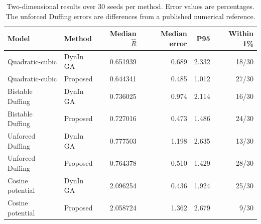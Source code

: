 \begin{table}[htbp]
\centering\small
\caption{Two-dimensional results over 30 seeds per method. Error values are percentages. The unforced Duffing errors are differences from a published numerical reference.}
\label{tab:comparison-2d}
\begin{tabularx}{\linewidth}{@{}Y l r r r r@{}}
\toprule
Model & Method & Median $\hat R$ & Median error & P95 & Within 1\% \\
\midrule
Quadratic-cubic & DynIn GA & 0.651939 & 0.689 & 2.332 & 18/30 \\
Quadratic-cubic & Proposed & 0.644341 & 0.485 & 1.012 & 27/30 \\
Bistable Duffing & DynIn GA & 0.736025 & 0.974 & 2.114 & 16/30 \\
Bistable Duffing & Proposed & 0.727016 & 0.473 & 1.486 & 24/30 \\
Unforced Duffing & DynIn GA & 0.777503 & 1.198 & 2.635 & 13/30 \\
Unforced Duffing & Proposed & 0.764378 & 0.510 & 1.429 & 28/30 \\
Cosine potential & DynIn GA & 2.096254 & 0.436 & 1.924 & 25/30 \\
Cosine potential & Proposed & 2.058724 & 1.362 & 2.679 & 9/30 \\
\bottomrule
\end{tabularx}
\end{table}
